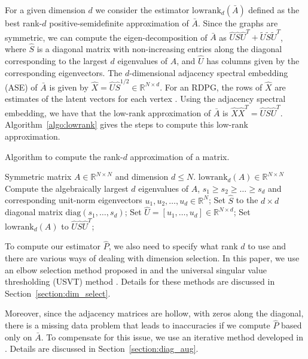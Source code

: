\documentclass[10pt,letterpaper]{article}
\renewcommand{\Re}{\mathbb{R}}
\renewcommand{\hat}{\widehat}
\begin{document}
For a given dimension $d$ we consider the estimator $\mathrm{lowrank}_d(\bar{A})$ defined as the best rank-$d$ positive-semidefinite approximation of $\bar{A}$.
Since the graphs are symmetric, we can compute the eigen-decomposition of $\bar{A}$ as $\hat{U} \hat{S} \hat{U}^T + \tilde{U}\tilde{S}\tilde{U}^T$, where $\hat{S}$ is a diagonal matrix with non-increasing entries along the diagonal corresponding to the largest $d$ eigenvalues of $A$, and $\hat{U}$ has columns given by the corresponding eigenvectors.
The $d$-dimensional adjacency spectral embedding (ASE) of $\bar{A}$ is given by $\hat{X}=\hat{U} \hat{S}^{1/2}\in \Re^{N \times d}$.
For an RDPG, the rows of $\hat{X}$ are estimates of the latent vectors for each vertex \citep{sussman2014consistent}.
Using the adjacency spectral embedding, we have that the low-rank approximation of $\bar{A}$ is $\hat{X} \hat{X}^T=\hat{U}\hat{S}\hat{U}^T$.
Algorithm~\ref{algo:lowrank} gives the steps to compute this low-rank approximation.

\begin{algorithm}[H]
\caption{Algorithm to compute the rank-$d$ approximation of a matrix.}
\label{algo:lowrank}
\begin{algorithmic}[1]
\REQUIRE Symmetric matrix $A\in \Re^{N\times N}$ and dimension $d\leq N$.
\ENSURE $\mathrm{lowrank}_d(A)\in \Re^{N\times N}$
\STATE Compute the algebraically largest $d$ eigenvalues of $A$, $s_1\geq s_2\geq \dotsc\geq s_d$ and corresponding unit-norm eigenvectors $u_1,u_2,\dotsc,u_d\in \Re^N$;
\STATE Set $\hat{S}$ to the $d\times d$ diagonal matrix $\mathrm{diag}(s_1,\dotsc,s_d)$;
\STATE Set $\hat{U} = [u_1,\dotsc,u_d]\in \Re^{N\times d}$;
\STATE Set $\mathrm{lowrank}_d(A)$ to $\hat{U}\hat{S}\hat{U}^T$;
\end{algorithmic}
\end{algorithm}

To compute our estimator $\hat{P}$, we also need to specify what rank $d$ to use and there are various ways of dealing with dimension selection. 
In this paper, we use an elbow selection method proposed in \citet{zhu2006automatic} and the universal singular value thresholding (USVT) method \citep{chatterjee2015matrix}. 
Details for these methods are discussed in Section~\ref{section:dim_select}.

Moreover, since the adjacency matrices are hollow, with zeros along the diagonal, there is a missing data problem that leads to inaccuracies if we compute $\hat{P}$ based only on $\bar{A}$. 
To compensate for this issue, we use an iterative method developed in \citet{scheinerman2010modeling}. 
Details are discussed in Section~\ref{section:diag_aug}.
\end{document}
